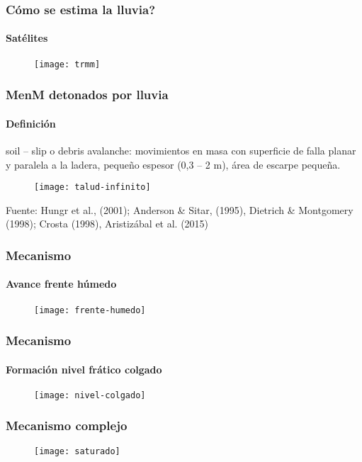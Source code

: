 \documentclass[12pt]{beamer}
\begin{document}
\begin{frame}
\frametitle{Cómo se estima la lluvia?}
\framesubtitle{Satélites}
\begin{figure}
\centering
\texttt{[image: trmm]} 
\end{figure}
\end{frame}
\begin{frame}
\frametitle{MenM detonados por lluvia}
\framesubtitle{Definición}
\scriptsize{soil – slip o debris avalanche: movimientos en masa con superficie de falla planar y paralela a la ladera, pequeño espesor  (0,3 – 2 m), área de escarpe pequeña.
}
\begin{figure}
\centering
\texttt{[image: talud-infinito]} 
\end{figure}
\tiny{Fuente: Hungr et al., (2001); Anderson \& Sitar, (1995), Dietrich \& Montgomery (1998); Crosta (1998), Aristizábal et  al.  (2015) }
\end{frame}
\begin{frame}
\frametitle{Mecanismo}
\framesubtitle{Avance frente húmedo}
\begin{figure}
\centering
\texttt{[image: frente-humedo]} 
\end{figure}
\end{frame}
\begin{frame}
\frametitle{Mecanismo}
\framesubtitle{Formación nivel frático colgado}
\begin{figure}
\centering
\texttt{[image: nivel-colgado]} 
\end{figure}
\end{frame}
\begin{frame}
\frametitle{Mecanismo complejo}
\begin{figure}
\centering
\texttt{[image: saturado]} 
\end{figure}
\end{frame}
\end{document}

